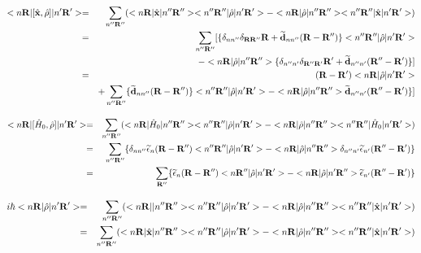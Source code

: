 \documentclass[aps,prb,preprint]{revtex4-1}
\begin{document}
\begin{appendix}
\begin{eqnarray}
 < n{\bf R}| [\hat{\bf x}, \hat{\rho} ]|n'{\bf R'}> = && \sum_{n''{\bf R''}} ( < n{\bf R}| \hat{\bf x}|n''{\bf R''}> < n''{\bf R''}|\hat{\rho} |n'{\bf R'}> -< n{\bf R}| \hat{\rho}|n''{\bf R''}> < n''{\bf R''}|\hat{\bf x} |n'{\bf R'}> ) \nonumber \\
 = && \sum_{n''{\bf R''}} [ \{ \delta_{nn''} \delta_{\bf RR''} {\bf R}  + {\bf \widetilde d}_{nn''}({\bf R-R''}) \} < n''{\bf R''}|\hat{\rho} |n'{\bf R'}> \nonumber \\
 &&-< n{\bf R}| \hat{\rho}|n''{\bf R''}> \{ \delta_{n''n'} \delta_{\bf R''R'} {\bf R'}  + {\bf \widetilde d}_{n''n'}({\bf R''-R'}) \} ] \nonumber \\
  = && ({\bf R-R'}) < n{\bf R}|\hat{\rho} |n'{\bf R'}>  \nonumber \\
  && + \sum_{n''{\bf R''}} \{ {\bf \widetilde d}_{nn''}({\bf R-R''}) \} < n''{\bf R''}|\hat{\rho} |n'{\bf R'}> -< n{\bf R}| \hat{\rho}|n''{\bf R''}> {\bf \widetilde d}_{n''n'}({\bf R''-R'}) \} ] \nonumber \\
\end{eqnarray} 

\begin{eqnarray}
 < n{\bf R}| [\hat{H}_0, \hat{\rho} ]|n'{\bf R'}> = && \sum_{n''{\bf R''}} ( < n{\bf R}| \hat{H}_0 |n''{\bf R''}> < n''{\bf R''}|\hat{\rho} |n'{\bf R'}> -< n{\bf R}| \hat{\rho}|n''{\bf R''}> < n''{\bf R''}|\hat{H}_0 |n'{\bf R'}> ) \nonumber \\
 = && \sum_{n''{\bf R''}} \{ \delta_{nn''} \widetilde{\epsilon}_{n}({\bf R- R''} )  < n''{\bf R''}|\hat{\rho} |n'{\bf R'}> - < n{\bf R}| \hat{\rho}|n''{\bf R''}> \delta_{n''n'} \widetilde{\epsilon}_{n'}({\bf R''- R'} )   \} \nonumber \\
  = && \sum_{\bf R''} \{ \widetilde{\epsilon}_{n}({\bf R- R''} )  < n{\bf R''}|\hat{\rho} |n'{\bf R'}> - < n{\bf R}| \hat{\rho}|n'{\bf R''}> \widetilde{\epsilon}_{n'}({\bf R''- R'} )   \} \nonumber \\
\end{eqnarray} 

\begin{eqnarray}
 i \hbar < n{\bf R}| \hat{\rho} |n'{\bf R'}> = && \sum_{n''{\bf R''}} ( < n{\bf R}| |n''{\bf R''}> < n''{\bf R''}|\hat{\rho} |n'{\bf R'}> -< n{\bf R}| \hat{\rho}|n''{\bf R''}> < n''{\bf R''}|\hat{\bf x} |n'{\bf R'}> ) \nonumber \\
 = && \sum_{n''{\bf R''}} ( < n{\bf R}| \hat{\bf x}|n''{\bf R''}> < n''{\bf R''}|\hat{\rho} |n'{\bf R'}> -< n{\bf R}| \hat{\rho}|n''{\bf R''}> < n''{\bf R''}|\hat{\bf x} |n'{\bf R'}> ) \nonumber \\ 
\end{eqnarray} 




\end{appendix}
\end{document}
